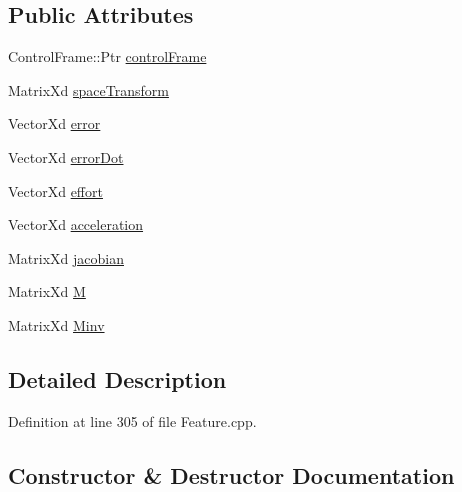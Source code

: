 \subsection*{Public Attributes}
\begin{DoxyCompactItemize}
\item 
Control\+Frame\+::\+Ptr \hyperlink{structocra_1_1PointContactFeature_1_1Pimpl_a1988b1e00c4db34a5afdac8f92b8e542}{control\+Frame}
\item 
Matrix\+Xd \hyperlink{structocra_1_1PointContactFeature_1_1Pimpl_a2636a91b8abaabb52ac34a4121e9e115}{space\+Transform}
\item 
Vector\+Xd \hyperlink{structocra_1_1PointContactFeature_1_1Pimpl_aabf12f72f637db8c9fac8208f513ab48}{error}
\item 
Vector\+Xd \hyperlink{structocra_1_1PointContactFeature_1_1Pimpl_a9dc4c6e3ed1c44c57bf5543197eaca17}{error\+Dot}
\item 
Vector\+Xd \hyperlink{structocra_1_1PointContactFeature_1_1Pimpl_ad35d11a459c7be6bae5fe8005c734ffa}{effort}
\item 
Vector\+Xd \hyperlink{structocra_1_1PointContactFeature_1_1Pimpl_a31eac1c12e3c617613656a3efdff310c}{acceleration}
\item 
Matrix\+Xd \hyperlink{structocra_1_1PointContactFeature_1_1Pimpl_a324288a2a8620b723b27d8e4d0c54a79}{jacobian}
\item 
Matrix\+Xd \hyperlink{structocra_1_1PointContactFeature_1_1Pimpl_aa282b2bf576f7d24103a24ffbafba657}{M}
\item 
Matrix\+Xd \hyperlink{structocra_1_1PointContactFeature_1_1Pimpl_a2dfc0e883abbf6c22aace78df3677bb7}{Minv}
\end{DoxyCompactItemize}


\subsection{Detailed Description}


Definition at line 305 of file Feature.\+cpp.



\subsection{Constructor \& Destructor Documentation}

